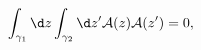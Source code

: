 \begin{equation}
\int_{\gamma_1} \d z \int_{\gamma_2} \d z' {\cal A}(z)
{\cal A}(z')=0,\label{locality}
\end{equation}

